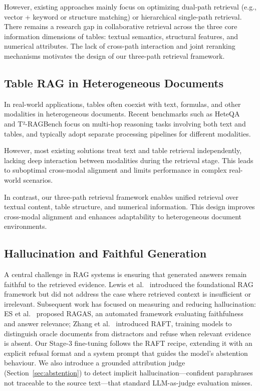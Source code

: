 \documentclass[10pt,conference]{IEEEtran}
\begin{document}
However, existing approaches mainly focus on optimizing dual-path retrieval (e.g., vector + keyword or structure matching) or hierarchical single-path retrieval. There remains a research gap in collaborative retrieval across the three core information dimensions of tables: textual semantics, structural features, and numerical attributes. The lack of cross-path interaction and joint reranking mechanisms motivates the design of our three-path retrieval framework.


\subsection{Table RAG in Heterogeneous Documents}

In real-world applications, tables often coexist with text, formulas, and other modalities in heterogeneous documents. Recent benchmarks such as HeteQA~\cite{heteqa} and T²-RAGBench focus on multi-hop reasoning tasks involving both text and tables, and typically adopt separate processing pipelines for different modalities.

However, most existing solutions treat text and table retrieval independently, lacking deep interaction between modalities during the retrieval stage. This leads to suboptimal cross-modal alignment and limits performance in complex real-world scenarios.

In contrast, our three-path retrieval framework enables unified retrieval over textual content, table structure, and numerical information. This design improves cross-modal alignment and enhances adaptability to heterogeneous document environments.

\subsection{Hallucination and Faithful Generation}

A central challenge in RAG systems is ensuring that generated answers remain
faithful to the retrieved evidence.
Lewis et al.~\cite{rag} introduced the foundational RAG framework but did not
address the case where retrieved context is insufficient or irrelevant.
Subsequent work has focused on measuring and reducing hallucination: ES et al.~\cite{ragas} proposed RAGAS, an automated framework evaluating faithfulness and
answer relevance; Zhang et al.~\cite{zhang2024raft} introduced RAFT,
training models to distinguish oracle documents from distractors and refuse when
relevant evidence is absent.
Our Stage-3 fine-tuning follows the RAFT recipe, extending it with an explicit
refusal format and a system prompt that guides the model's abstention
behaviour.
We also introduce a grounded attribution judge (Section~\ref{sec:abstention})
to detect implicit hallucination---confident paraphrases not traceable to the
source text---that standard LLM-as-judge evaluation misses.
\end{document}
